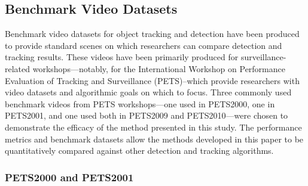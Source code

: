 \documentclass[smallcondensed, final]{svjour3}
\newcommand{\willie}[1]{\textcolor{green}{\textsf{\emph{\textbf{\textcolor{green}{#1}}}}}}
\begin{document}





\subsection{Benchmark Video Datasets}

Benchmark video datasets for object tracking and detection have been produced to provide standard scenes on which researchers can compare detection and tracking results. These videos have been primarily produced for surveillance-related workshops---notably, for the International Workshop on Performance Evaluation of Tracking and Surveillance (PETS)--which provide researchers with video datasets and algorithmic goals on which to focus. Three commonly used benchmark videos from PETS workshops---one used in PETS2000, one in PETS2001, and one used both in PETS2009 and PETS2010---were chosen to demonstrate the efficacy of the method presented in this study. The performance metrics and benchmark datasets allow the methods developed in this paper to be quantitatively compared against other detection and tracking algorithms.


\subsubsection{PETS2000 and PETS2001}
\label{sec:pets2000_2001}
\end{document}
